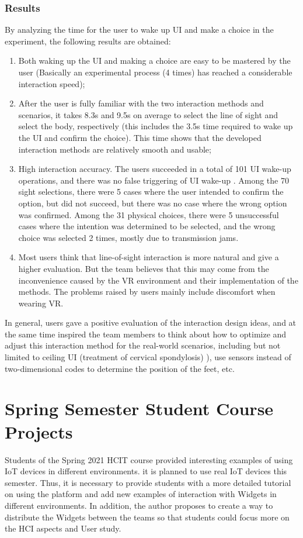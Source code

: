 \subsubsection{Results}

By analyzing the time for the user to wake up UI and make a choice in the experiment, the following results are obtained:
\begin{enumerate}
    \item Both waking up the UI and making a choice are easy to be mastered by the user (Basically an experimental process (4 times) has reached a considerable interaction speed);
    \item After the user is fully familiar with the two interaction methods and scenarios, it takes 8.3s and 9.5s on average to select the line of sight and select the body, respectively (this includes the 3.5s time required to wake up the UI and confirm the choice). This time shows that the developed interaction methods are relatively smooth and usable;
    \item High interaction accuracy.  The users succeeded in a total of 101 UI wake-up operations, and there was no false triggering of UI wake-up . Among the 70 sight selections, there were 5 cases where the user intended to confirm the option, but did not succeed, but there was no case where the wrong option was confirmed. Among the 31 physical choices, there were 5 unsuccessful cases where the intention was determined to be selected, and the wrong choice was selected 2 times, mostly due to transmission jams.
    \item Most users think that line-of-sight interaction is more natural and give a higher evaluation. But the team believes that this may come from the inconvenience caused by the VR environment and their implementation of the methods. The problems raised by users mainly include discomfort when wearing VR.
\end{enumerate}


In general, users gave a positive evaluation of the interaction design ideas, and at the same time inspired the team members to think about how to optimize and adjust this interaction method for the real-world scenarios, including but not limited to ceiling UI (treatment of cervical spondylosis) ), use sensors instead of two-dimensional codes to determine the position of the feet, etc.

\section{Spring Semester Student Course Projects}

Students of the Spring 2021 HCIT course provided interesting examples of using IoT devices in different environments. it is planned to use real IoT devices this semester. Thus, it is necessary to provide students with a more detailed tutorial on using the platform and add new examples of interaction with Widgets in different environments. In addition, the author proposes to create a way to distribute the  Widgets between the teams so that students could focus more on the HCI aspects and User study. 